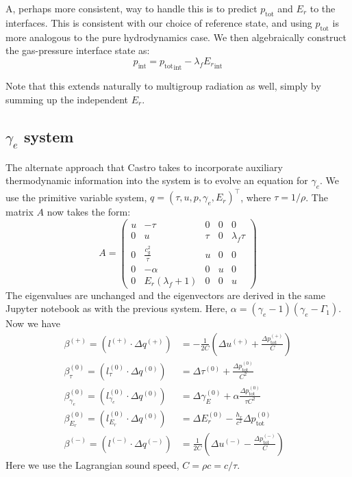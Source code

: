 \documentclass[12pt]{article}
\newcommand{\evm}{{(-)}}
\newcommand{\evz}{{(0)}}
\newcommand{\evp}{{(+)}}
\begin{document}
A, perhaps more consistent, way to handle this is to predict $p_\mathrm{tot}$
and $E_r$ to the interfaces.  This is consistent with our choice of
reference state, and using $p_\mathrm{tot}$ is more analogous to the
pure hydrodynamics case.  We then algebraically construct the
gas-pressure interface state as:
\begin{equation}
p_\mathrm{int} = {p_\mathrm{tot}}_\mathrm{int} - \lambda_f {E_r}_\mathrm{int}
\end{equation}

Note that this extends naturally to multigroup radiation as well, simply by
summing up the independent $E_r$.

\subsection*{$\gamma_e$ system}

The alternate approach that Castro takes to incorporate auxiliary
thermodynamic information into the system is to evolve an equation for
$\gamma_e$.  We use the primitive variable system, $q = (\tau, u, p,
\gamma_e, E_r)^\intercal$, where $\tau = 1/\rho$.  The matrix $A$ now
takes the form:
\begin{equation}
A = \left (
   \begin{matrix}
   u & - \tau & 0 & 0 & 0\\
   0 & u & \tau & 0 & \lambda_f \tau\\
   0 & \frac{c_{g}^{2}}{\tau} & u & 0 & 0\\
   0 & - \alpha & 0 & u & 0\\
   0 & E_{r} \left(\lambda_f + 1\right) & 0 & 0 & u
\end{matrix}\right)
\end{equation}
The eigenvalues are unchanged and the eigenvectors are derived in the
same Jupyter notebook as with the previous system.  
Here, $\alpha = (\gamma_e - 1)(\gamma_e - \Gamma_1)$.
Now we have
\begin{align}
\beta^\evp = ( l^\evp \cdot \Delta q^\evp ) &= -\frac{1}{2C}
   \left ( \Delta u^\evp + \frac{\Delta p_\mathrm{tot}^\evp}{C} \right ) \\
\beta^\evz_\tau = ( l^\evz_\tau \cdot \Delta q^\evz ) &= 
   \Delta \tau^\evz + \frac{\Delta p_\mathrm{tot}^\evz}{C^2} \\
\beta^\evz_{\gamma_e} = ( l^\evz_{\gamma_e} \cdot \Delta q^\evz ) &= 
   \Delta \gamma_E^\evz + \alpha \frac{\Delta p_\mathrm{tot}^\evz}{\tau C^2} \\
\beta^\evz_{E_r} = ( l^\evz_{E_r} \cdot \Delta q^\evz ) &= 
   \Delta E_r^\evz - \frac{h_r}{c^2} \Delta p_\mathrm{tot}^\evz \\
\beta^\evm = ( l^\evm \cdot \Delta q^\evm ) &= \frac{1}{2C} 
   \left ( \Delta u^\evm - \frac{\Delta p_\mathrm{tot}^\evm}{C} \right ) 
\end{align}
Here we use the Lagrangian sound speed, $C = \rho c = c/\tau$.
\end{document}
